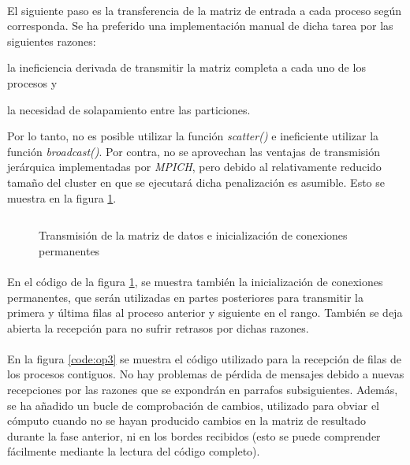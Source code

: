 \documentclass[10pt, a4paper,spanish]{article}
\begin{document}
		\paragraph{}
		El siguiente paso es la transferencia de la matriz de entrada a cada proceso según corresponda. Se ha preferido una implementación manual de dicha tarea por las siguientes razones: \begin {enumerate*} [label=\itshape\alph*\upshape)]
					\item la ineficiencia derivada de transmitir la matriz completa a cada uno de los procesos y
					\item la necesidad de solapamiento entre las particiones.
		\end {enumerate*} Por lo tanto, no es posible utilizar la función \emph{scatter()} e ineficiente utilizar la función \emph{broadcast()}. Por contra, no se aprovechan las ventajas de transmisión jerárquica implementadas por \emph{MPICH}, pero debido al relativamente reducido tamaño del cluster en que se ejecutará dicha penalización es asumible. Esto se muestra en la figura \ref{code:op2}.

		\begin{figure}[H]
			\centering
			\inputminted{c}{./code/op2.c}
			\caption{Transmisión de la matriz de datos e inicialización de conexiones permanentes}
			\label{code:op2}
		\end{figure}

		\paragraph{}
		En el código de la figura \ref{code:op2}, se muestra también la inicialización de conexiones permanentes, que serán utilizadas en partes posteriores para transmitir la primera y última filas al proceso anterior y siguiente en el rango. También se deja abierta la recepción para no sufrir retrasos por dichas razones.

		\paragraph{}
		En la figura \ref{code:op3} se muestra el código utilizado para la recepción de filas de los procesos contiguos. No hay problemas de pérdida de mensajes debido a nuevas recepciones por las razones que se expondrán en parrafos subsiguientes. Además, se ha añadido un bucle de comprobación de cambios, utilizado para obviar el cómputo cuando no se hayan producido cambios en la matriz de resultado durante la fase anterior, ni en los bordes recibidos (esto se puede comprender fácilmente mediante la lectura del código completo).
\end{document}
